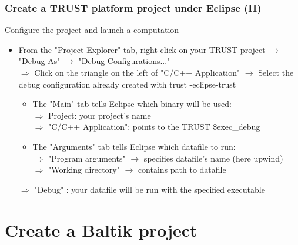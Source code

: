 \documentclass[10pt, hyperref={unicode=true,pdfusetitle, bookmarks=true,bookmarksnumbered=false,bookmarksopen=false, breaklinks=false,pdfborder={0 0 1},backref=true,colorlinks=true,linkcolor=darkblue,pageanchor, urlcolor=darkblue}]{beamer}
\begin{document}
\begin{frame}
\frametitle{Create a TRUST platform project under Eclipse (II)}

\begin{exampleblock}{Configure the project and launch a computation}
\begin{itemize}
\item From the "Project Explorer" tab, right click on your TRUST project $\rightarrow$ "Debug As" $\rightarrow$ "Debug Configurations..."\\
  \vspace{0.1cm}
  $\Rightarrow$ Click on the triangle on the left of "C/C++ Application" $\rightarrow$ Select the debug configuration already created with trust -eclipse-trust
  \vspace{0.1cm}
  \begin{itemize}
  \item The "Main" tab tells Eclipse which binary will be used: \\
  $\Rightarrow$ Project: your project's name \\
  $\Rightarrow$ "C/C++ Application": points to the TRUST \$exec\_debug \\
  \vspace{0.1cm}
  \item The "Arguments" tab tells Eclipse which datafile to run:\\
  $\Rightarrow$ "Program arguments" $\rightarrow$ specifies datafile's name (here upwind) \\
  $\Rightarrow$ "Working directory" $\rightarrow$ contains path to datafile \\
  \end{itemize}
  \vspace{0.1cm}
  $\Rightarrow$ "Debug" : your datafile will be run with the specified executable
\end{itemize}
\end{exampleblock}

\end{frame}


\section{{\bf{Create a Baltik project}}}
\end{document}
